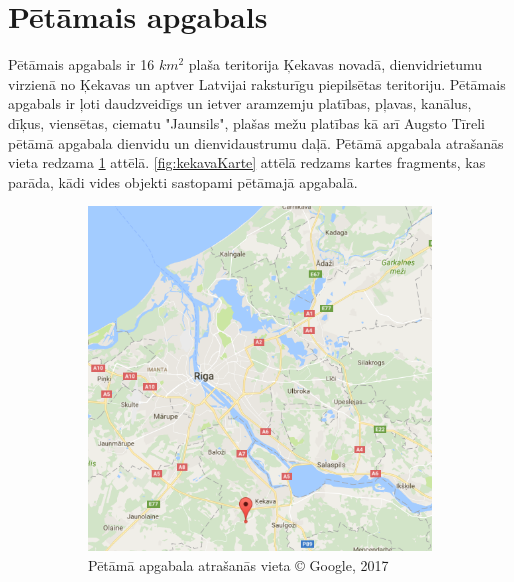 \documentclass[12pt,paper=a4]{report}
\begin{document}
\section{Pētāmais apgabals}
Pētāmais apgabals ir 16 $km^2$ plaša teritorija Ķekavas novadā, dienvidrietumu virzienā no Ķekavas un aptver Latvijai raksturīgu piepilsētas teritoriju. Pētāmais apgabals ir ļoti daudzveidīgs un ietver aramzemju platības, pļavas, kanālus, dīķus, viensētas, ciematu "Jaunsils", plašas mežu platības kā arī Augsto Tīreli pētāmā apgabala dienvidu un dienvidaustrumu daļā. Pētāmā apgabala atrašanās vieta redzama \ref{fig:lielaKarte} attēlā. \ref{fig:kekavaKarte} attēlā redzams kartes fragments, kas parāda, kādi vides objekti sastopami pētāmajā apgabalā.
\begin{figure}[h!]
\centering
\begin{subfigure}[b]{.49\linewidth}
\includegraphics[width=\linewidth]{karte}
\caption{Pētāmā apgabala atrašanās vieta © Google, 2017}\label{fig:lielaKarte}
\end{subfigure}
\begin{subfigure}[b]{.49\linewidth}

\end{subfigure}
\end{figure}
\end{document}
